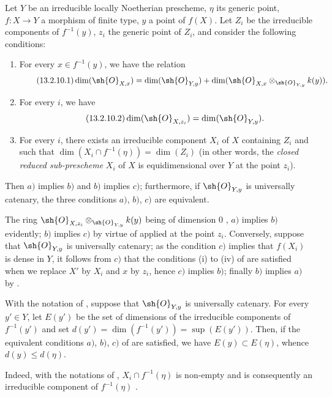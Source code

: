\begin{proposition}[13.2.10]
\label{IV.13.2.10}
Let $Y$ be an irreducible locally Noetherian prescheme, $\eta$ its generic point, $f:X\to Y$ a morphism of finite type, $y$ a point of $f(X)$.
Let $Z_i$ be the
irreducible components of $f^{-1}(y)$, $z_i$ the generic point of $Z_i$, and consider the following conditions:
\begin{enumerate}[label=\emph{\alph*)}]
  \item For every $x\in f^{-1}(y)$, we have the relation
  \[
  \tag{13.2.10.1}
\label{IV.13.2.10.1}
    \dim(\sh{O}_{X,x})=\dim(\sh{O}_{Y,y})+\dim(\sh{O}_{X,x}\otimes_{\sh{O}_{Y,y}}k(y)).
  \]
  \item For every $i$, we have
  \[
  \tag{13.2.10.2}
    \dim(\sh{O}_{X,z_i})=\dim(\sh{O}_{Y,y}).
  \]
  \item For every $i$, there exists an irreducible component $X_i$ of $X$ containing $Z_i$ and such that $\dim(X_i\cap f^{-1}(\eta))=\dim(Z_i)$ (in other words, the \emph{closed reduced sub-prescheme} $X_i$ of $X$ is equidimensional over $Y$ at the point $z_i$).
\end{enumerate}
Then $a)$ implies $b)$ and $b)$ implies $c)$; furthermore, if $\sh{O}_{Y,y}$ is universally catenary, the three conditions $a)$, $b)$, $c)$ are equivalent.
\end{proposition}

The ring $\sh{O}_{X,z_i}\otimes_{\sh{O}_{Y,y}}k(y)$ being of dimension $0$ , $a)$ implies $b)$ evidently; $b)$ implies $c)$ by virtue of  applied at the point $z_i$.
Conversely, suppose that $\sh{O}_{Y,y}$ is universally catenary; as the condition $c)$ implies that $f(X_i)$ is dense in $Y$, it follows from $c)$ that the conditions (i) to (iv) of  are satisfied when we replace $X'$ by $X_i$ and $x$ by $z_i$, hence $c)$ implies $b)$; finally $b)$ implies $a)$ by .

\begin{corollary}[13.2.11]
\label{IV.13.2.11}
With the notation of , suppose that $\sh{O}_{Y,y}$ is universally catenary.
For every $y'\in Y$, let $E(y')$ be the set of dimensions of the irreducible components of $f^{-1}(y')$ and set $d(y')=\dim(f^{-1}(y'))=\sup(E(y'))$.
Then, if the equivalent conditions $a)$, $b)$, $c)$ of  are satisfied, we have $E(y)\subset E(\eta)$, whence $d(y)\leq d(\eta)$.
\end{corollary}

Indeed, with the notations of , $X_i\cap f^{-1}(\eta)$ is non-empty and is consequently an irreducible component of $f^{-1}(\eta)$ .

